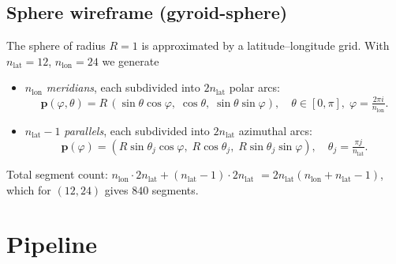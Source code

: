\documentclass[11pt]{article}
\begin{document}
\subsection{Sphere wireframe (gyroid-sphere)}

The sphere of radius $R=1$ is approximated by a latitude--longitude
grid.  With $n_\text{lat}=12$, $n_\text{lon}=24$ we generate
\begin{itemize}
  \item $n_\text{lon}$ \emph{meridians}, each subdivided into
        $2n_\text{lat}$ polar arcs:
        \[
          \mathbf{p}(\varphi, \theta) =
          R\,(\sin\theta\cos\varphi,\; \cos\theta,\; \sin\theta\sin\varphi),
          \quad
          \theta \in [0,\pi],\;
          \varphi = \tfrac{2\pi i}{n_\text{lon}}.
        \]
  \item $n_\text{lat}-1$ \emph{parallels}, each subdivided into
        $2n_\text{lat}$ azimuthal arcs:
        \[
          \mathbf{p}(\varphi)
          = (R\sin\theta_j\cos\varphi,\; R\cos\theta_j,\;
             R\sin\theta_j\sin\varphi),
          \quad
          \theta_j = \tfrac{\pi j}{n_\text{lat}}.
        \]
\end{itemize}
Total segment count: $n_\text{lon}\cdot 2n_\text{lat}
+ (n_\text{lat}-1)\cdot 2n_\text{lat}$
$= 2n_\text{lat}(n_\text{lon}+n_\text{lat}-1)$,
which for $(12,24)$ gives $840$ segments.

\section{Pipeline}
\end{document}
